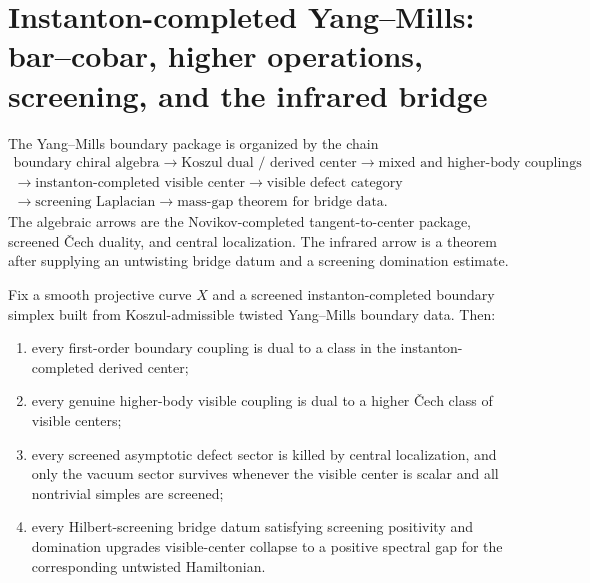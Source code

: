 \providecommand{\cH}{\mathcal{H}}
\providecommand{\cB}{\mathcal{B}}
\providecommand{\Barch}{\overline{B}^{\mathrm{ch}}}

\section{Instanton-completed Yang--Mills: bar--cobar, higher operations, screening, and the infrared bridge}
\label{sec:ym-instanton-ir-frontier}
\label{sec:ym-platonic-ideal-synthesis}

\begin{summary}
The Yang--Mills boundary package is organized by the chain
\begin{gather*}
\text{boundary chiral algebra}
\longrightarrow
\text{Koszul dual / derived center}
\longrightarrow
\text{mixed and higher-body couplings}\\
\longrightarrow
\text{instanton-completed visible center}
\longrightarrow
\text{visible defect category}\\
\longrightarrow
\text{screening Laplacian}
\longrightarrow
\text{mass-gap theorem for bridge data}.
\end{gather*}
The algebraic arrows are the Novikov-completed tangent-to-center package,
screened \v{C}ech duality, and central localization.
The infrared arrow is a theorem after supplying an untwisting bridge datum
and a screening domination estimate.
\end{summary}

\begin{theorem}
\label{thm:grand-synthesis-principle}
Fix a smooth projective curve $X$ and a screened instanton-completed boundary simplex built from
Koszul-admissible twisted Yang--Mills boundary data.
Then:
\begin{enumerate}[label=(\roman*)]
\item every first-order boundary coupling is dual to a class in the instanton-completed derived center;
\item every genuine higher-body visible coupling is dual to a higher \v{C}ech class of visible centers;
\item every screened asymptotic defect sector is killed by central localization, and only the vacuum sector
survives whenever the visible center is scalar and all nontrivial simples are screened;
\item every Hilbert-screening bridge datum satisfying screening positivity and domination upgrades
visible-center collapse to a positive spectral gap for the corresponding untwisted Hamiltonian.
\end{enumerate}
\end{theorem}

